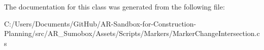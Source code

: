 The documentation for this class was generated from the following file\+:\begin{DoxyCompactItemize}
\item 
C\+:/\+Users/\+Documents/\+Git\+Hub/\+A\+R-\/\+Sandbox-\/for-\/\+Construction-\/\+Planning/src/\+A\+R\+\_\+\+Sumobox/\+Assets/\+Scripts/\+Markers/Marker\+Change\+Intersection.\+cs\end{DoxyCompactItemize}
